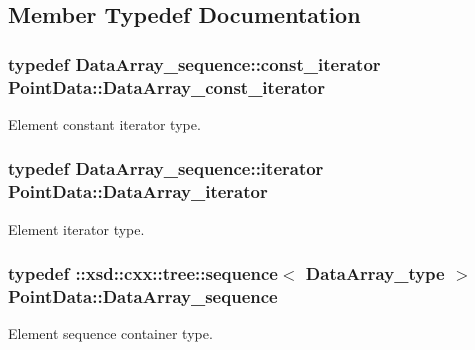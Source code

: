 \subsection{Member Typedef Documentation}
\hypertarget{classPointData_a6bd3313479b6a109e24bc9e7b306831b}{}
\subsubsection[{Data\+Array\+\_\+const\+\_\+iterator}]{\setlength{\rightskip}{0pt plus 5cm}typedef Data\+Array\+\_\+sequence\+::const\+\_\+iterator {\bf Point\+Data\+::\+Data\+Array\+\_\+const\+\_\+iterator}}\label{classPointData_a6bd3313479b6a109e24bc9e7b306831b}


Element constant iterator type. 

\hypertarget{classPointData_afb66f793f2a65ca38e3cd8fa21eef701}{}
\subsubsection[{Data\+Array\+\_\+iterator}]{\setlength{\rightskip}{0pt plus 5cm}typedef Data\+Array\+\_\+sequence\+::iterator {\bf Point\+Data\+::\+Data\+Array\+\_\+iterator}}\label{classPointData_afb66f793f2a65ca38e3cd8fa21eef701}


Element iterator type. 

\hypertarget{classPointData_acd882fa412789571fcaa2599ad2b2c71}{}
\subsubsection[{Data\+Array\+\_\+sequence}]{\setlength{\rightskip}{0pt plus 5cm}typedef \+::xsd\+::cxx\+::tree\+::sequence$<$ {\bf Data\+Array\+\_\+type} $>$ {\bf Point\+Data\+::\+Data\+Array\+\_\+sequence}}\label{classPointData_acd882fa412789571fcaa2599ad2b2c71}


Element sequence container type. 

\hypertarget{classPointData_ae9066a14984b6f7aa938ba2d58244055}{}
